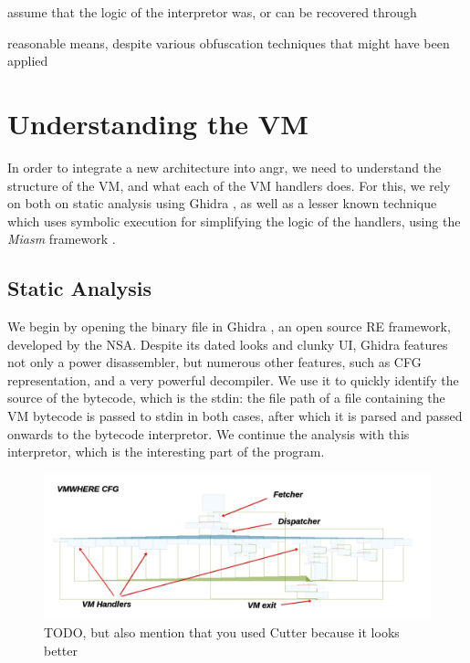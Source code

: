 assume that the logic of the interpretor was, or can be recovered through


reasonable means, despite various obfuscation techniques that might have been
applied 


\section{Understanding the VM}

In order to integrate a new architecture into angr, we need to understand the structure of the \gls{VM}, and what each of the \gls{VM} handlers does. For this, we rely on both on static analysis using Ghidra \cite{TODO}, as well as a lesser known technique which uses symbolic execution for simplifying the logic of the handlers, using the \emph{Miasm} framework \cite{TODO tim blog}.

\subsection{Static Analysis}

We begin by opening the binary file in Ghidra \cite{TODO}, an open source \gls{RE} framework, developed by the \gls{NSA}. Despite its dated looks and clunky \gls{UI}, Ghidra features not only a power disassembler, but numerous other features, such as \gls{CFG} representation, and a very powerful decompiler. We use it to quickly identify the source of the bytecode, which is the \gls{stdin}: the file path of a file containing the \gls{VM} bytecode is passed to \gls{stdin} in both cases, after which it is parsed and passed onwards to the bytecode interpretor. We continue the analysis with this interpretor, which is the interesting part of the program.

\begin{figure}[h]
    \centering
    \includegraphics[width=\textwidth]{./images/cfg_vmwhere}
    \caption{TODO, but also mention that you used Cutter because it looks better}
    \label{fig:cfg_vmwhere}
\end{figure}

